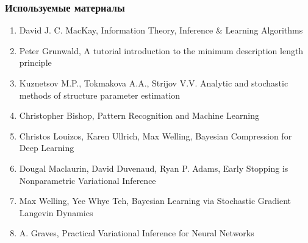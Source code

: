 \documentclass[10pt,pdf,utf8,russian,aspectratio=169]{beamer}
\begin{document}
\begin{frame}
\frametitle{Используемые материалы}
\begin{enumerate}
\item David J. C. MacKay, Information Theory, Inference \& Learning Algorithms
\item Peter Grunwald, A tutorial introduction to the minimum description length principle
\item Kuznetsov M.P., Tokmakova A.A., Strijov V.V. Analytic and stochastic methods of structure parameter estimation
\item Christopher Bishop, Pattern Recognition and Machine Learning
\item Christos Louizos, Karen Ullrich, Max Welling, Bayesian Compression for Deep Learning
\item Dougal Maclaurin, David Duvenaud, Ryan P. Adams, Early Stopping is Nonparametric Variational Inference
\item Max Welling, Yee Whye Teh, Bayesian Learning via Stochastic Gradient Langevin Dynamics
\item A. Graves, Practical Variational Inference for Neural Networks
\end{enumerate}
\end{frame}
\end{document}
